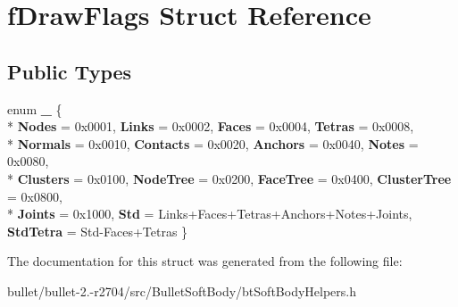 \hypertarget{structf_draw_flags}{\section{f\+Draw\+Flags Struct Reference}
\label{structf_draw_flags}
}
\subsection*{Public Types}
\begin{DoxyCompactItemize}
\item 
\hypertarget{structf_draw_flags_adf4a6d2e254e39d6a24fa924cfb82ecc}{enum {\bfseries \+\_\+} \{ \\*
{\bfseries Nodes} = 0x0001, 
{\bfseries Links} = 0x0002, 
{\bfseries Faces} = 0x0004, 
{\bfseries Tetras} = 0x0008, 
\\*
{\bfseries Normals} = 0x0010, 
{\bfseries Contacts} = 0x0020, 
{\bfseries Anchors} = 0x0040, 
{\bfseries Notes} = 0x0080, 
\\*
{\bfseries Clusters} = 0x0100, 
{\bfseries Node\+Tree} = 0x0200, 
{\bfseries Face\+Tree} = 0x0400, 
{\bfseries Cluster\+Tree} = 0x0800, 
\\*
{\bfseries Joints} = 0x1000, 
{\bfseries Std} = Links+\+Faces+\+Tetras+\+Anchors+\+Notes+\+Joints, 
{\bfseries Std\+Tetra} = Std-\/\+Faces+\+Tetras
 \}}\label{structf_draw_flags_adf4a6d2e254e39d6a24fa924cfb82ecc}

\end{DoxyCompactItemize}


The documentation for this struct was generated from the following file\+:\begin{DoxyCompactItemize}
\item 
bullet/bullet-\/2.-\/r2704/src/\+Bullet\+Soft\+Body/bt\+Soft\+Body\+Helpers.\+h\end{DoxyCompactItemize}
